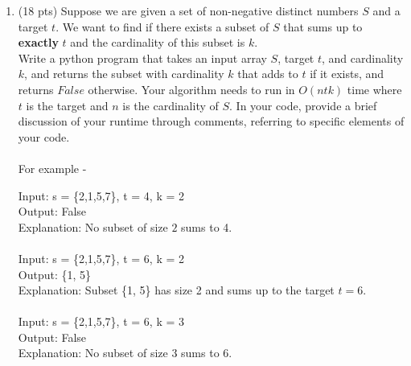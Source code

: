 \documentclass[12pt]{article}
\theoremstyle{remark}
\begin{document}
\begin{enumerate}
\begin{enumerate}
	\end{enumerate}

\item (18 pts) Suppose we are given a set of non-negative distinct numbers $S$ and a target $t$. We want to find if there exists a subset of $S$ that sums up to \textbf{exactly} $t$ and the cardinality of this subset is $k$. 
\\Write a python program that takes an input array $S$, target $t$, and cardinality $k$, and returns the subset with cardinality $k$ that adds to $t$ if it exists, and returns $False$ otherwise. Your algorithm needs to run in $O(ntk)$ time where $t$ is the target and $n$ is the cardinality of $S$. In your code, provide a brief discussion of your runtime through comments, referring to specific elements of your code.\\
\\For example - 

Input: s = \{2,1,5,7\}, t = 4, k = 2\\
Output: False\\
Explanation:  No subset of size $2$ sums to 4.\\\\
Input: s = \{2,1,5,7\}, t = 6, k = 2\\
Output: \{1, 5\}\\
Explanation:  Subset \{1, 5\} has size 2 and sums up to the target $t = 6$.\\\\
Input: s = \{2,1,5,7\}, t = 6, k = 3\\
Output: False\\
Explanation:  No subset of size $3$ sums to 6.\\\\

\noindent
\end{enumerate}
\end{document}
